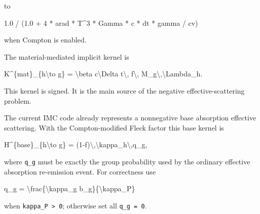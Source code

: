\documentclass[
]{article}
\newenvironment{Shaded}{}{}
\newcommand{\DecValTok}[1]{\textcolor[rgb]{0.25,0.63,0.44}{#1}}
\newcommand{\FloatTok}[1]{\textcolor[rgb]{0.25,0.63,0.44}{#1}}
\newcommand{\NormalTok}[1]{#1}
\newcommand{\OperatorTok}[1]{\textcolor[rgb]{0.40,0.40,0.40}{#1}}
\begin{document}
to

\begin{Shaded}
\begin{Highlighting}[]
\FloatTok{1.0} \OperatorTok{/} \OperatorTok{(}\FloatTok{1.0} \OperatorTok{+} \DecValTok{4} \OperatorTok{*}\NormalTok{ arad }\OperatorTok{*}\NormalTok{ T}\OperatorTok{\^{}}\DecValTok{3} \OperatorTok{*}\NormalTok{ Gamma }\OperatorTok{*}\NormalTok{ c }\OperatorTok{*}\NormalTok{ dt }\OperatorTok{*}\NormalTok{ gamma }\OperatorTok{/}\NormalTok{ cv}\OperatorTok{)}
\end{Highlighting}
\end{Shaded}

when Compton is enabled.

The material-mediated implicit kernel is

\begin{Shaded}
\begin{Highlighting}[]
\NormalTok{K\^{}\{mat\}\_\{h\textbackslash{}to g\} = \textbackslash{}beta c\textbackslash{}Delta t\textbackslash{}, f\textbackslash{}, M\_g\textbackslash{},\textbackslash{}Lambda\_h.}
\end{Highlighting}
\end{Shaded}

This kernel is signed. It is the main source of the negative
effective-scattering problem.

The current IMC code already represents a nonnegative base absorption
effective scattering. With the Compton-modified Fleck factor this base
kernel is

\begin{Shaded}
\begin{Highlighting}[]
\NormalTok{H\^{}\{base\}\_\{h\textbackslash{}to g\} = (1{-}f)\textbackslash{},\textbackslash{}kappa\_h\textbackslash{},q\_g,}
\end{Highlighting}
\end{Shaded}

where \texttt{q\_g} must be exactly the group probability used by the
ordinary effective absorption re-emission event. For correctness use

\begin{Shaded}
\begin{Highlighting}[]
\NormalTok{q\_g = \textbackslash{}frac\{\textbackslash{}kappa\_g b\_g\}\{\textbackslash{}kappa\_P\}}
\end{Highlighting}
\end{Shaded}

when \texttt{kappa\_P\ \textgreater{}\ 0}; otherwise set all
\texttt{q\_g\ =\ 0}.
\end{document}
